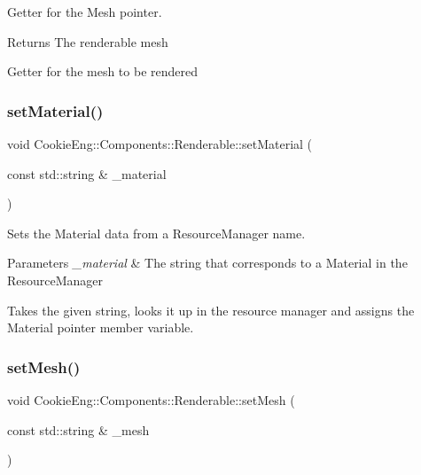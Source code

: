 Getter for the Mesh pointer. 

\begin{DoxyReturn}{Returns}
The renderable mesh
\end{DoxyReturn}
Getter for the mesh to be rendered \mbox{\label{class_cookie_eng_1_1_components_1_1_renderable_a5ea9d1153bbe51b264c20102f8c72db9}} 
\subsubsection{\texorpdfstring{set\+Material()}{setMaterial()}}
{\footnotesize\ttfamily void Cookie\+Eng\+::\+Components\+::\+Renderable\+::set\+Material (\begin{DoxyParamCaption}\item[{const std\+::string \&}]{\+\_\+material }\end{DoxyParamCaption})}



Sets the Material data from a Resource\+Manager name. 


\begin{DoxyParams}{Parameters}
{\em \+\_\+material} & The string that corresponds to a Material in the Resource\+Manager\\
\hline
\end{DoxyParams}
Takes the given string, looks it up in the resource manager and assigns the Material pointer member variable. \mbox{\label{class_cookie_eng_1_1_components_1_1_renderable_a4b9903e0bfb81ec574d022d7b2c198af}} 
\subsubsection{\texorpdfstring{set\+Mesh()}{setMesh()}}
{\footnotesize\ttfamily void Cookie\+Eng\+::\+Components\+::\+Renderable\+::set\+Mesh (\begin{DoxyParamCaption}\item[{const std\+::string \&}]{\+\_\+mesh }\end{DoxyParamCaption})}



